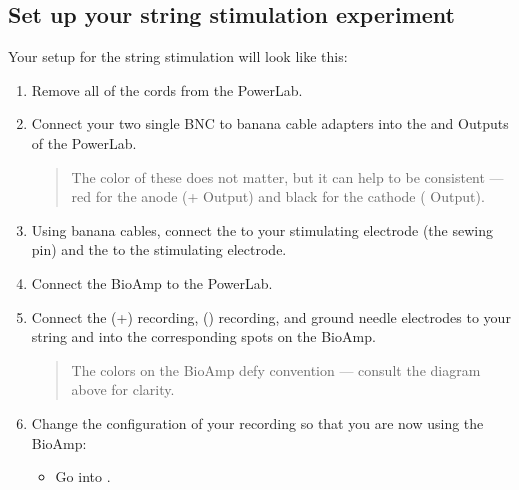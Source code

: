 \documentclass[letterpaper,10pt,english]{jupyterBook}
\begin{document}
\subsection{Set up your string stimulation experiment}
\label{\detokenize{StringNervousSystems:set-up-your-string-stimulation-experiment}}
\sphinxAtStartPar
Your setup for the string stimulation will look like this:

\sphinxAtStartPar
{}
\begin{enumerate}
%
\item {} 
\sphinxAtStartPar
Remove all of the cords from the PowerLab.

\item {} 
\sphinxAtStartPar
Connect your two single BNC to banana cable adapters into the \sphinxstylestrong{(+)} and \sphinxstylestrong{(\sphinxhyphen{})} Outputs of the PowerLab.
\begin{quote}

\sphinxAtStartPar
{} The color of these does not matter, but it can help to be consistent — red for the anode (+ Output) and black for the cathode (\sphinxhyphen{} Output).
\end{quote}

\item {} 
\sphinxAtStartPar
Using banana cables, connect the  to your  stimulating electrode (the sewing pin) and the  to the  stimulating electrode.

\item {} 
\sphinxAtStartPar
Connect the BioAmp to the PowerLab.

\item {} 
\sphinxAtStartPar
Connect the (+) recording, (\sphinxhyphen{}) recording, and ground needle electrodes to your string and into the corresponding spots on the BioAmp.
\begin{quote}

\sphinxAtStartPar
{} The colors on the BioAmp defy convention — consult the diagram above for clarity.
\end{quote}

\item {} 
\sphinxAtStartPar
Change the configuration of your recording so that you are now using the BioAmp:
\begin{itemize}
\item {} 
\sphinxAtStartPar
Go into .


\end{itemize}
\end{enumerate}
\end{document}
